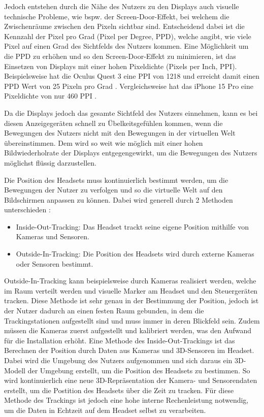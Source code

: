     Jedoch entstehen durch die Nähe des Nutzers zu den Displays auch visuelle technische Probleme, wie bspw. der Screen-Door-Effekt, bei welchem die Zwischenräume zwischen den Pixeln sichtbar sind.
    Entscheidend dabei ist die Kennzahl der Pixel pro Grad (Pixel per Degree, PPD), welche angibt, wie viele Pixel auf einen Grad des Sichtfelds des Nutzers kommen.
    Eine Möglichkeit um die PPD zu erhöhen und so den Screen-Door-Effekt zu minimieren, ist das Einsetzen von Displays mit einer hohen Pixeldichte (Pixels per Inch, PPI).
    Beispielsweise hat die Oculus Quest 3 eine PPI von 1218 und erreicht damit einen PPD Wert von 25 Pixeln pro Grad \autocite[]{meta-quest-3}.
    Vergleichsweise hat das iPhone 15 Pro eine Pixeldichte von nur 460 PPI \autocite[]{iPhone15Pro-datenblatt}.

    Da die Displays jedoch das gesamte Sichtfeld des Nutzers einnehmen, kann es bei diesen Anzeigegeräten schnell zu Übelkeitsgefühlen kommen, wenn die Bewegungen des Nutzers nicht mit den Bewegungen in der virtuellen Welt übereinstimmen.
    Dem wird so weit wie möglich mit einer hohen Bildwiederholrate der Displays entgegengewirkt, um die Bewegungen des Nutzers möglichst flüssig darzustellen.

    Die Position des Headsets muss kontinuierlich bestimmt werden, um die Bewegungen der Nutzer zu verfolgen und so die virtuelle Welt auf den Bildschirmen anpassen zu können.
    Dabei wird generell durch 2 Methoden unterschieden \autocite[]{Gourlay2017}:
    \begin{itemize}
      \item Inside-Out-Tracking: Das Headset trackt seine eigene Position mithilfe von Kameras und Sensoren.
      \item Outside-In-Tracking: Die Position des Headsets wird durch externe Kameras oder Sensoren bestimmt.
    \end{itemize}

    Outside-In-Tracking kann beispielsweise durch Kameras realisiert werden, welche im Raum verteilt werden und visuelle Marker am Headset und den Steuergeräten tracken.
    Diese Methode ist sehr genau in der Bestimmung der Position, jedoch ist der Nutzer dadurch an einen festen Raum gebunden, in dem die Trackingstationen aufgestellt sind und muss immer in deren Blickfeld sein.
    Zudem müssen die Kameras zuerst aufgestellt und kalibriert werden, was den Aufwand für die Installation erhöht.
    Eine Methode des Inside-Out-Trackings ist das Berechnen der Position durch Daten aus Kameras und 3D-Sensoren im Headset.
    Dabei wird die Umgebung des Nutzers aufgenommen und sich daraus ein 3D-Modell der Umgebung erstellt, um die Position des Headsets zu bestimmen.
    So wird kontinuierlich eine neue 3D-Repräsentation der Kamera- und Sensorendaten erstellt, um die Postition des Headsets über die Zeit zu tracken.
    Für diese Methode des Trackings ist jedoch eine hohe interne Rechenleistung notwendig, um die Daten in Echtzeit auf dem Headset selbst zu verarbeiten.

